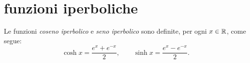 \section{funzioni iperboliche}

\begin{definition}
Le funzioni
\emph{coseno iperbolico} e \emph{seno iperbolico}
sono definite, per ogni $x\in \mathbb R$,
come segue:
\mymargin{$\sinh$, $\cosh$}
\index{$\sinh$}
\index{$\cosh$}
\begin{equation}
\label{eq:sinh_cosh}
  \cosh x = \frac{e^x + e^{-x}}{2},
  \qquad
  \sinh x = \frac{e^x - e^{-x}}{2}.
\end{equation}
\end{definition}

